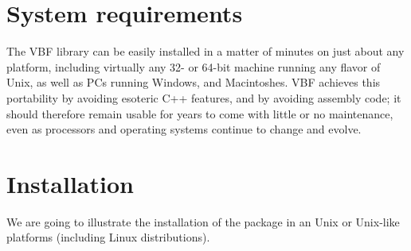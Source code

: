 \section{System requirements}\label{sec:System_requirements}

The VBF library can be easily installed in a matter of minutes on just about
any platform, including virtually any 32- or 64-bit machine running any flavor
of Unix, as well as PCs running Windows, and Macintoshes. VBF achieves this
portability by avoiding esoteric C++ features, and by avoiding assembly code;
it should therefore remain usable for years to come with little or no
maintenance, even as processors and operating systems continue to change and
evolve.

\section{Installation}\label{sec:Installation}

We are going to illustrate the installation of the package in an Unix or Unix-like platforms (including Linux distributions). 


